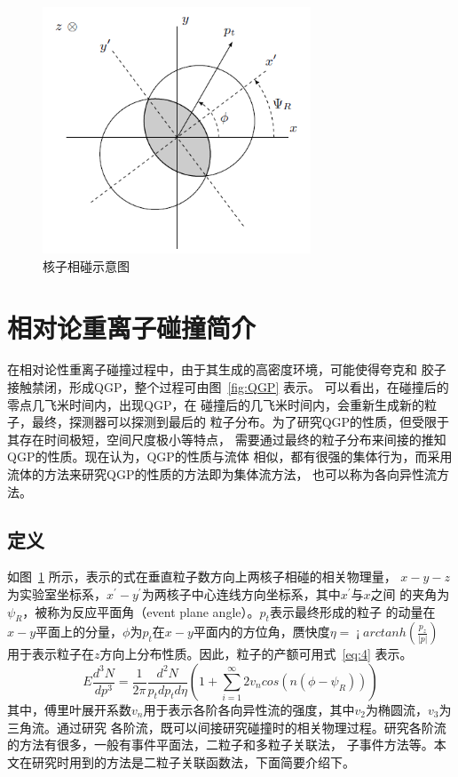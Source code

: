 \documentclass[aps,pre,12pt,preprint,onecolumn,showpacs,showkeys]{revtex4-1}
\begin{document}
\begin{figure}[htbp]
\centering
\includegraphics[width=80mm]{hz}
\caption{\label{fig:hz}%
核子相碰示意图}
\end{figure}
\section{相对论重离子碰撞简介}
在相对论性重离子碰撞过程中，由于其生成的高密度环境，可能使得夸克和
胶子接触禁闭，形成QGP，整个过程可由图~\ref{fig:QGP} 表示\cite{2013PhDT........31Q}。
可以看出，在碰撞后的零点几飞米时间内，出现QGP，在
碰撞后的几飞米时间内，会重新生成新的粒子，最终，探测器可以探测到最后的
粒子分布。为了研究QGP的性质，但受限于其存在时间极短，空间尺度极小等特点，
需要通过最终的粒子分布来间接的推知QGP的性质。现在认为，QGP的性质与流体
相似，都有很强的集体行为，而采用流体的方法来研究QGP的性质的方法即为集体流方法，
也可以称为各向异性流方法\cite{2010LanB...23..240H}。
\subsection{定义}
如图~\ref{fig:hz} 所示，表示的式在垂直粒子数方向上两核子相碰的相关物理量，
$x-y-z$为实验室坐标系，$x^{'}-y^{'}$为两核子中心连线方向坐标系，其中$x^{'}$与$x$之间
的夹角为$\psi_{R}$，被称为反应平面角（event plane angle）。$p_{t}$表示最终形成的粒子
的动量在$x-y$平面上的分量，$\phi$为$p_{t}$在$x-y$平面内的方位角，赝快度$\eta=\operatorname¡{arctanh}(\frac{p_{z}}{|p|})$
用于表示粒子在$z$方向上分布性质。因此，粒子的产额可用式~\ref{eq:4} 表示\cite{PhysRevC.58.1671}。
\begin{equation}
E\frac{d^{3}N}{dp^{3}}=\frac{1}{2\pi}\frac{d^{2}N}{p_{t}dp_{t}d\eta}(1+\sum_{i=1}^{\infty}2v_{n}cos(n(\phi-\psi_{R}))) \label{eq:4}
\end{equation}
其中，傅里叶展开系数$v_{n}$用于表示各阶各向异性流的强度，其中$v_{2}$为椭圆流，$v_{3}$为三角流。通过研究
各阶流，既可以间接研究碰撞时的相关物理过程。研究各阶流的方法有很多，一般有事件平面法，二粒子和多粒子关联法，
子事件方法等。本文在研究时用到的方法是二粒子关联函数法，下面简要介绍下。
\end{document}
